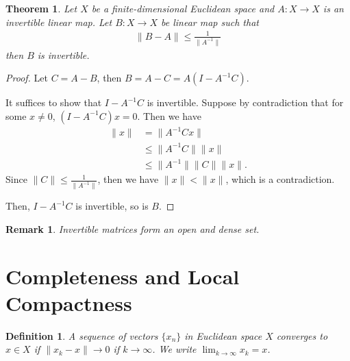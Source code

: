 \documentclass[11pt]{book}
\newtheorem{definition}{Definition}[section]
\newtheorem{theorem}{Theorem}[section]
\newtheorem{remark}{Remark}[section]
\theoremstyle{definition}
\numberwithin{equation}{subsection}
\begin{document}
\medskip

\begin{theorem}
Let $X$ be a finite-dimensional Euclidean space and $A:X\to X$ is an invertible linear map. Let $B:X\to X$ be linear map such that 
\begin{align*}
    \|B - A\| \leq \frac{1}{\|A^{-1}\|}
\end{align*}
then $B$ is invertible.
\end{theorem}
\begin{proof}
Let $C = A - B$, then $B = A - C = A\left(I - A^{-1}C\right)$. 

It suffices to show that $I - A^{-1}C$ is invertible. Suppose by contradiction that for some $x\neq 0$, $\left(I - A^{-1}C\right)x = 0$. Then we have
\begin{align*}
    \|x\| & = \|A^{-1}C x\| \\
    & \leq \|A^{-1}C\| \|x\| \\
    & \leq \|A^{-1}\| \|C\| \|x\|.
\end{align*}
Since $\|C\| \leq \frac{1}{\|A^{-1}\|}$, then we have $\|x\| < \|x\|$, which is a contradiction. 

Then, $I - A^{-1}C$ is invertible, so is $B$.
\end{proof}

\begin{remark}
Invertible matrices form an open and dense set.
\end{remark}

\medskip

\section{Completeness and Local Compactness}

\begin{definition}
A sequence of vectors $\{x_n\}$ in Euclidean space $X$ converges to $x\in X$ if $\|x_k - x\| \to 0$ if $k\to \infty$. We write $\lim_{k\to\infty}x_k = x$.
\end{definition}

\medskip
\end{document}
